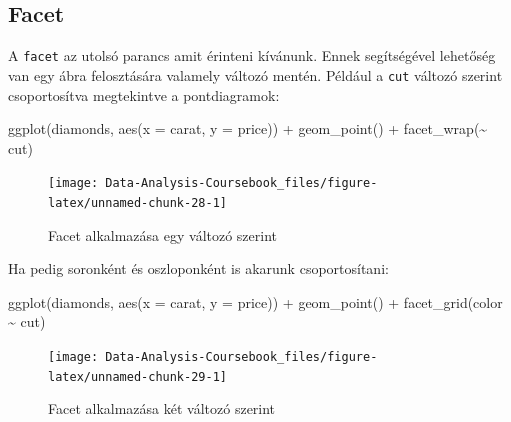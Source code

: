 \documentclass[
]{article}
\newenvironment{Shaded}{\begin{snugshade}}{\end{snugshade}}
\newcommand{\AttributeTok}[1]{\textcolor[rgb]{0.77,0.63,0.00}{#1}}
\newcommand{\FunctionTok}[1]{\textcolor[rgb]{0.00,0.00,0.00}{#1}}
\newcommand{\NormalTok}[1]{#1}
\newcommand{\SpecialCharTok}[1]{\textcolor[rgb]{0.00,0.00,0.00}{#1}}
\begin{document}
\hypertarget{facet}{%
\subsection{Facet}\label{facet}}

A \texttt{facet} az utolsó parancs amit érinteni kívánunk. Ennek segítségével lehetőség van egy ábra felosztására valamely változó mentén. Például a \texttt{cut} változó szerint csoportosítva megtekintve a pontdiagramok:

\begin{Shaded}
\begin{Highlighting}[]
\FunctionTok{ggplot}\NormalTok{(diamonds, }\FunctionTok{aes}\NormalTok{(}\AttributeTok{x =}\NormalTok{ carat, }\AttributeTok{y =}\NormalTok{ price)) }\SpecialCharTok{+}
  \FunctionTok{geom\_point}\NormalTok{() }\SpecialCharTok{+}
  \FunctionTok{facet\_wrap}\NormalTok{(}\SpecialCharTok{\textasciitilde{}}\NormalTok{ cut)}
\end{Highlighting}
\end{Shaded}

\begin{figure}

{\centering \texttt{[image: Data-Analysis-Coursebook\_files/figure-latex/unnamed-chunk-28-1]} 

}

\caption{Facet alkalmazása egy változó szerint}\label{fig:unnamed-chunk-28}
\end{figure}

Ha pedig soronként és oszloponként is akarunk csoportosítani:

\begin{Shaded}
\begin{Highlighting}[]
\FunctionTok{ggplot}\NormalTok{(diamonds, }\FunctionTok{aes}\NormalTok{(}\AttributeTok{x =}\NormalTok{ carat, }\AttributeTok{y =}\NormalTok{ price)) }\SpecialCharTok{+}
  \FunctionTok{geom\_point}\NormalTok{() }\SpecialCharTok{+}
  \FunctionTok{facet\_grid}\NormalTok{(color }\SpecialCharTok{\textasciitilde{}}\NormalTok{ cut)}
\end{Highlighting}
\end{Shaded}

\begin{figure}

{\centering \texttt{[image: Data-Analysis-Coursebook\_files/figure-latex/unnamed-chunk-29-1]} 

}

\caption{Facet alkalmazása két változó szerint}\label{fig:unnamed-chunk-29}
\end{figure}
\end{document}
